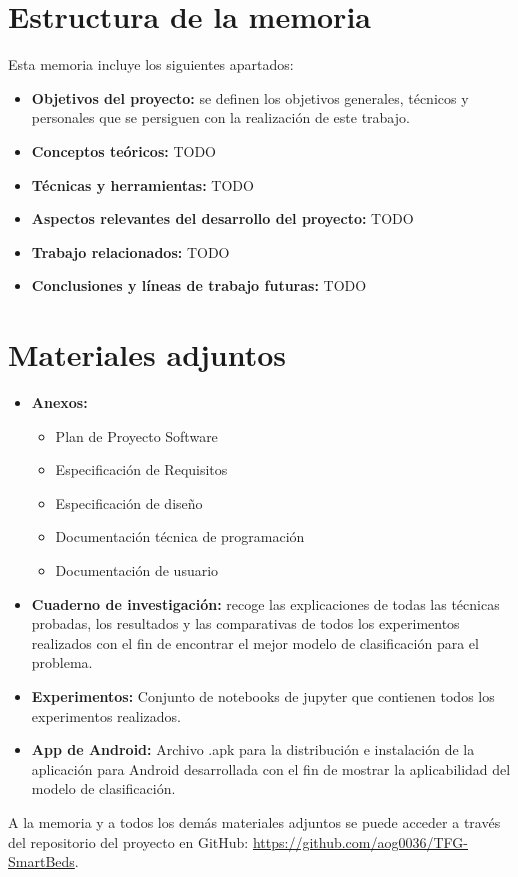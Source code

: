 \section{Estructura de la memoria}

Esta memoria incluye los siguientes apartados: 

\begin{itemize}
	\item \textbf{Objetivos del proyecto:} se definen los objetivos generales, técnicos y personales que se persiguen con la realización de este trabajo. 
	\item \textbf{Conceptos teóricos:} TODO
	\item \textbf{Técnicas y herramientas:} TODO
	\item \textbf{Aspectos relevantes del desarrollo del proyecto:} TODO
	\item \textbf{Trabajo relacionados:} TODO
	\item \textbf{Conclusiones y líneas de trabajo futuras:} TODO
\end{itemize}

\section{Materiales adjuntos}

\begin{itemize}	
	\item \textbf{Anexos:}
	\begin{itemize}
		\item Plan de Proyecto Software 
		\item Especificación de Requisitos
		\item Especificación de diseño
		\item Documentación técnica de programación 
		\item Documentación de usuario 
	\end{itemize}
	\item \textbf{Cuaderno de investigación:} recoge las explicaciones de todas las técnicas probadas, los resultados y las comparativas de todos los experimentos realizados con el fin de encontrar el mejor modelo de clasificación para el problema. 
	\item \textbf{Experimentos:} Conjunto de notebooks de jupyter que contienen todos los experimentos realizados. 
	\item \textbf{App de Android:} Archivo .apk para la distribución e instalación de la aplicación para Android desarrollada con el fin de mostrar la aplicabilidad del modelo de clasificación. 
\end{itemize}

A la memoria y a todos los demás materiales adjuntos se puede acceder a través del repositorio del proyecto en GitHub: \url{https://github.com/aog0036/TFG-SmartBeds}. 


